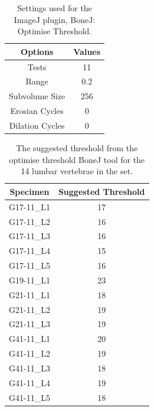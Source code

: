 \begin{table}[ht!]
	\caption{Settings used for the ImageJ plugin, BoneJ: Optimise Threshold.}
	\label{tab:bonej}
	\centering
	\begin{tabular}{c|c}
    Options & Values \\
    \hline
    \hline
    Tests & 11  \\
    Range & 0.2 \\
    Subvolume Size & 256 \\
    Erosian Cycles & 0 \\
    Dilation Cycles & 0 \\
    \hline
	\end{tabular}
\end{table}

\begin{table}[ht!]
	\caption{The suggested threshold from the optimise threshold BoneJ tool for
    the 14 lumbar vertebrae in the set.}
	\label{tab:optTH}
	\centering
	\begin{tabular}{c|c}
    Specimen    & Suggested Threshold   \\ \hline \hline
    G17-11\_L1 & 17 \\
    G17-11\_L2 & 16\\
    G17-11\_L3 & 16\\
    G17-11\_L4 & 15\\
    G17-11\_L5 & 16\\
    G19-11\_L1 & 23\\
    G21-11\_L1 & 18\\
    G21-11\_L2 & 19\\
    G21-11\_L3 & 19\\
    G41-11\_L1 & 20\\
    G41-11\_L2 & 19\\
    G41-11\_L3 & 18\\
    G41-11\_L4 & 19\\
    G41-11\_L5 & 18\\
    \hline
	\end{tabular}
\end{table}

